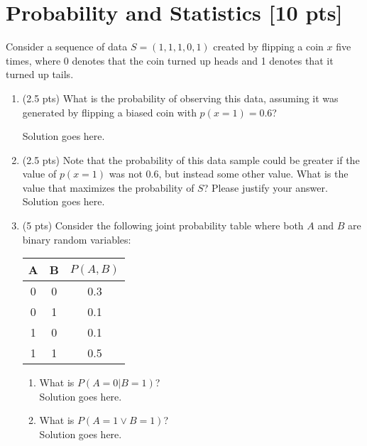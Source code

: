 \documentclass[a4paper]{article}
\theoremstyle{definition}
\newenvironment{soln}{
	\leavevmode\color{blue}\ignorespaces
}{}
\begin{document}
	
	
	
	\section{Probability and Statistics [10 pts]}
	Consider a sequence of data $S = (1, 1, 1, 0, 1)$ created by flipping a coin $x$ five times, where 0 denotes that the coin turned up heads and 1 denotes that it turned up tails.
	\begin{enumerate}
		\item 	(2.5 pts) What is the probability of observing this data, assuming it was generated by flipping a biased coin with $p(x=1) = 0.6$?
		
		\begin{soln}  Solution goes here. \end{soln}
		
		\item 	(2.5 pts) Note that the probability of this data sample could be greater if the value of $p(x = 1)$ was not $0.6$, but instead some other value. What is the value that maximizes the probability of $S$? Please justify your answer.\\
		\begin{soln}  Solution goes here. \end{soln}
		
		\item 	(5 pts) Consider the following joint probability table where both $A$ and $B$ are binary random variables: 
		\begin{table}[htb]
			\centering
			\begin{tabular}{ccc}\hline
				A & B & $P(A, B)$  \\\hline
				0 & 0 & 0.3 \\
				0 & 1 & 0.1 \\
				1 & 0 & 0.1 \\
				1 & 1 & 0.5 \\\hline
			\end{tabular}
		\end{table}
		\begin{enumerate}
			\item 	What is $P(A = 0 | B = 1)$?\\
			 \begin{soln}  Solution goes here. \end{soln}
			 
			\item 	What is $P(A = 1 \vee B = 1 )$?\\
		     \begin{soln}  Solution goes here. \end{soln}
		\end{enumerate}
	\end{enumerate}
	
\end{document}
